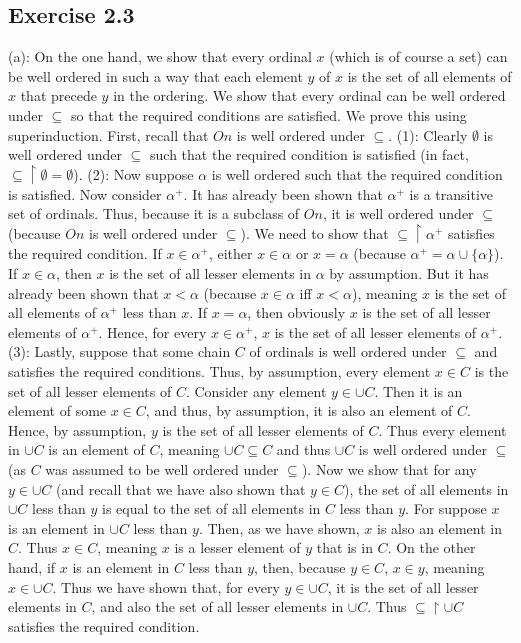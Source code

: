 \documentclass{article}
\theoremstyle{definition}
\begin{document}
\subsection*{Exercise 2.3}
(a): On the one hand, we show that every ordinal $x$ (which is of course a set) 
can be well ordered in such a way that each element $y$ of 
$x$ is the set of all elements of $x$ that precede $y$ in the ordering. We show that every ordinal 
can be well ordered under $\subseteq$ so that the required conditions are satisfied. We prove this 
using superinduction. First, recall that $On$ is well ordered under $\subseteq$.\newline
(1): Clearly $\emptyset$ is well ordered under $\subseteq$ such that the required condition is 
satisfied (in fact, $\subseteq\restriction\emptyset=\emptyset$).\newline
(2): Now suppose $\alpha$ is well ordered such that the required condition is satisfied. Now consider 
$\alpha^+$. It has already been shown that $\alpha^+$ is a transitive set of ordinals. Thus, because 
it is a subclass of $On$, it is well ordered under $\subseteq$ (because $On$ is well ordered under 
$\subseteq$). We need to show that $\subseteq\restriction\alpha^+$ satisfies the required condition. 
If $x\in\alpha^+$, either $x\in\alpha$ or $x=\alpha$ (because $\alpha^+=\alpha\cup\{\alpha\}$). 
If $x\in\alpha$, then $x$ is the set of all lesser elements in $\alpha$ by assumption. But it has 
already been shown that $x<\alpha$ (because $x\in\alpha$ iff $x<\alpha$), meaning 
$x$ is the set of all elements of $\alpha^+$ less than $x$. If $x=\alpha$, then obviously 
$x$ is the set of all lesser elements of $\alpha^+$. Hence, for every $x\in\alpha^+$, $x$ is the set of all 
lesser elements of $\alpha^+$.\newline
(3): Lastly, suppose that some chain $C$ of ordinals is well ordered under $\subseteq$ and satisfies
the required conditions. Thus, by assumption, every element $x\in C$ is the set of all lesser elements 
of $C$. Consider any element $y\in\cup C$. Then it is an element of some $x\in C$, and thus, by assumption, 
it is also an element of $C$. Hence, by assumption, $y$ is the set of all lesser elements of $C$. Thus every 
element in $\cup C$ is an element of $C$, meaning $\cup C\subseteq C$ and thus $\cup C$ is well ordered 
under $\subseteq$ (as $C$ was assumed to be well ordered under $\subseteq$). Now we show that for any $y\in\cup C$ (and 
recall that we have also shown that $y\in C$), the 
set of all elements in $\cup C$ less than $y$ is equal to the set of all elements in $C$ less than $y$. For suppose 
$x$ is an element in $\cup C$ less than $y$. Then, as we have shown, $x$ is also an element in $C$. Thus $x\in C$, meaning $x$ is 
a lesser element of $y$ that is in $C$. 
On the other hand, if $x$ is an element in $C$ less than $y$, then, because $y\in C$, $x\in y$, meaning $x\in\cup C$. Thus we 
have shown that, for every $y\in\cup C$, it is the set of all lesser elements in $C$, and also the set of all lesser 
elements in $\cup C$. Thus $\subseteq\restriction\cup C$ satisfies the required condition.
\end{document}
